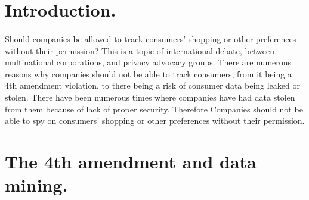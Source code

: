 \doublespacing{}
\section{Introduction.}
\paragraph{}
Should companies be allowed to track consumers' shopping or other preferences
without their permission? This is a topic of international debate,
between multinational corporations, and privacy advocacy groups. There are
numerous reasons why companies should not be able to track consumers, from
it being a 4th amendment violation, to there being a risk of consumer data
being leaked or stolen. There have been numerous times where companies have
had data stolen from them because of lack of proper security. Therefore
Companies should not be able to spy on consumers' shopping or other
preferences without their permission.
\par

\section{The 4th amendment and data mining.}
